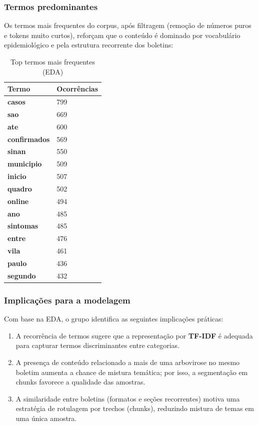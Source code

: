 \subsubsection{Termos predominantes}

Os termos mais frequentes do corpus, após filtragem (remoção de números puros e tokens muito curtos), reforçam que o conteúdo é dominado por vocabulário epidemiológico e pela estrutura recorrente dos boletins:

\begin{table}[h]
\centering
\renewcommand{\arraystretch}{1.15}
\begin{tabularx}{\textwidth}{>{\bfseries}l Y}
\toprule
Termo & Ocorrências \\
\midrule
casos & 799 \\
sao & 669 \\
ate & 600 \\
confirmados & 569 \\
sinan & 550 \\
municipio & 509 \\
inicio & 507 \\
quadro & 502 \\
online & 494 \\
ano & 485 \\
sintomas & 485 \\
entre & 476 \\
vila & 461 \\
paulo & 436 \\
segundo & 432 \\
\bottomrule
\end{tabularx}
\caption{Top termos mais frequentes (EDA)}
\label{tab:toptermos}
\end{table}

\subsubsection{Implicações para a modelagem}

Com base na EDA, o grupo identifica as seguintes implicações práticas:

\begin{enumerate}[leftmargin=1.2cm]
    \item A recorrência de termos sugere que a representação por \textbf{TF-IDF} é adequada para capturar termos discriminantes entre categorias.
    \item A presença de conteúdo relacionado a mais de uma arbovirose no mesmo boletim aumenta a chance de mistura temática; por isso, a segmentação em chunks favorece a qualidade das amostras.
    \item A similaridade entre boletins (formatos e seções recorrentes) motiva uma estratégia de rotulagem por trechos (chunks), reduzindo mistura de temas em uma única amostra.
\end{enumerate}

